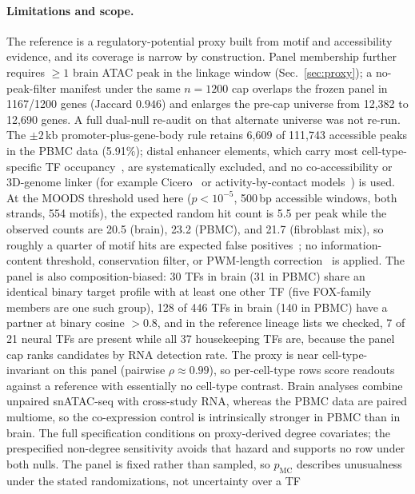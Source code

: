 \documentclass[fleqn,10pt,lineno]{wlpeerj}
\begin{document}
\paragraph{Limitations and scope.}
The reference is a regulatory-potential proxy built from motif and accessibility evidence, and its
coverage is narrow by construction. Panel membership further requires $\ge1$ brain ATAC peak in the
linkage window (Sec.~\ref{sec:proxy}); a no-peak-filter manifest under the same $n=1200$ cap
overlaps the frozen panel in 1167/1200 genes (Jaccard $0.946$) and enlarges the pre-cap universe
from 12{,}382 to 12{,}690 genes.
A full dual-null re-audit
on that alternate universe was not re-run. The $\pm2$\,kb
promoter-plus-gene-body rule retains 6{,}609 of
111{,}743 accessible peaks in the PBMC data (5.91\%); distal enhancer elements, which carry most
cell-type-specific TF occupancy~\citep{thurman2012accessible}, are systematically excluded, and no co-accessibility or
3D-genome linker (for example Cicero~\citep{pliner2018cicero} or activity-by-contact models~\citep{fulco2019activity}) is used. At the MOODS
threshold used here ($p<10^{-5}$, 500\,bp accessible windows, both strands, 554 motifs), the
expected random hit count is 5.5 per peak while the observed counts are 20.5 (brain), 23.2
(PBMC), and 21.7 (fibroblast mix), so roughly a quarter of motif hits are expected false positives~\citep{wasserman2004applied};
no information-content threshold, conservation filter, or PWM-length correction~\citep{stormo2000dna} is applied. The
panel is also composition-biased: 30 TFs in brain (31 in PBMC) share an identical binary target
profile with at least one other TF (five FOX-family members are one such group), 128 of 446 TFs
in brain (140 in PBMC) have a partner at binary cosine $>0.8$, and in the reference lineage lists
we checked, 7 of 21 neural TFs are present while
all 37 housekeeping TFs are, because the panel cap ranks candidates by RNA detection rate. The
proxy is near cell-type-invariant on this panel (pairwise $\rho\approx0.99$), so per-cell-type rows
score readouts against a reference with essentially no cell-type contrast. Brain analyses combine
unpaired snATAC-seq with cross-study RNA, whereas the PBMC data are paired multiome, so the
co-expression control is intrinsically stronger in PBMC than in brain. The full specification
conditions on proxy-derived degree covariates; the prespecified non-degree sensitivity avoids
that hazard and supports no row under both nulls. The panel is fixed rather than sampled, so
$p_{\mathrm{MC}}$ describes unusualness under the stated randomizations, not uncertainty over a TF
\end{document}
